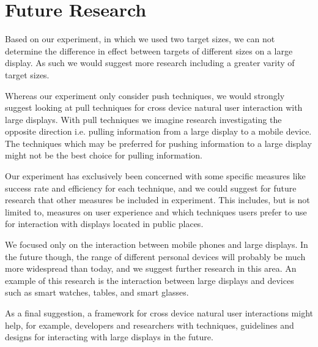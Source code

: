 \section{Future Research} \label{sec:futureresearch}
Based on our experiment, in which we used two target sizes, we can not determine the difference in effect between targets of different sizes on a large display. As such we would suggest more research including a greater varity of target sizes.

Whereas our experiment only consider push techniques, we would strongly suggest looking at pull techniques for cross device natural user interaction with large displays.
With pull techniques we imagine research investigating the opposite direction i.e. pulling information from a large display to a mobile device.
The techniques which may be preferred for pushing information to a large display might not be the best choice for pulling information.

Our experiment has exclusively been concerned with some specific measures like success rate and efficiency for each technique, and we could suggest for future research that other measures be included in experiment.
This includes, but is not limited to, measures on user experience and which techniques users prefer to use for interaction with displays located in public places.

We focused only on the interaction between mobile phones and large displays.
In the future though, the range of different personal devices will probably be much more widespread than today, and we suggest further research in this area.
An example of this research is the interaction between large displays and devices such as smart watches, tables, and smart glasses.

As a final suggestion, a framework for cross device natural user interactions might help, for example, developers and researchers with techniques, guidelines and designs for interacting with large displays in the future.